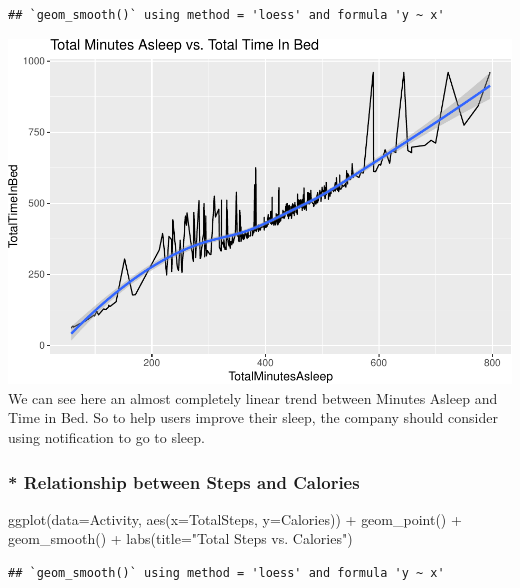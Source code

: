 \documentclass[
]{article}
\newenvironment{Shaded}{\begin{snugshade}}{\end{snugshade}}
\newcommand{\AttributeTok}[1]{\textcolor[rgb]{0.77,0.63,0.00}{#1}}
\newcommand{\FunctionTok}[1]{\textcolor[rgb]{0.00,0.00,0.00}{#1}}
\newcommand{\NormalTok}[1]{#1}
\newcommand{\SpecialCharTok}[1]{\textcolor[rgb]{0.00,0.00,0.00}{#1}}
\newcommand{\StringTok}[1]{\textcolor[rgb]{0.31,0.60,0.02}{#1}}
\begin{document}
\begin{verbatim}
## `geom_smooth()` using method = 'loess' and formula 'y ~ x'
\end{verbatim}

\includegraphics{Bellabeat_files/figure-latex/unnamed-chunk-18-1.pdf} We
can see here an almost completely linear trend between Minutes Asleep
and Time in Bed. So to help users improve their sleep, the company
should consider using notification to go to sleep.

\hypertarget{relationship-between-steps-and-calories}{%
\subsubsection{\texorpdfstring{* \textbf{Relationship between Steps and
Calories}}{* Relationship between Steps and Calories}}\label{relationship-between-steps-and-calories}}

\begin{Shaded}
\begin{Highlighting}[]
\FunctionTok{ggplot}\NormalTok{(}\AttributeTok{data=}\NormalTok{Activity, }\FunctionTok{aes}\NormalTok{(}\AttributeTok{x=}\NormalTok{TotalSteps, }\AttributeTok{y=}\NormalTok{Calories)) }\SpecialCharTok{+} \FunctionTok{geom\_point}\NormalTok{() }\SpecialCharTok{+} \FunctionTok{geom\_smooth}\NormalTok{() }\SpecialCharTok{+} \FunctionTok{labs}\NormalTok{(}\AttributeTok{title=}\StringTok{"Total Steps vs. Calories"}\NormalTok{)}
\end{Highlighting}
\end{Shaded}

\begin{verbatim}
## `geom_smooth()` using method = 'loess' and formula 'y ~ x'
\end{verbatim}
\end{document}

